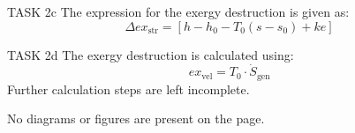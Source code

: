 TASK 2c  
The expression for the exergy destruction is given as:  
\[
\Delta ex_{\text{str}} = \left[ h - h_0 - T_0 (s - s_0) + ke \right]
\]  

TASK 2d  
The exergy destruction is calculated using:  
\[
ex_{\text{vel}} = T_0 \cdot \dot{S}_{\text{gen}}
\]  
Further calculation steps are left incomplete.  

No diagrams or figures are present on the page.